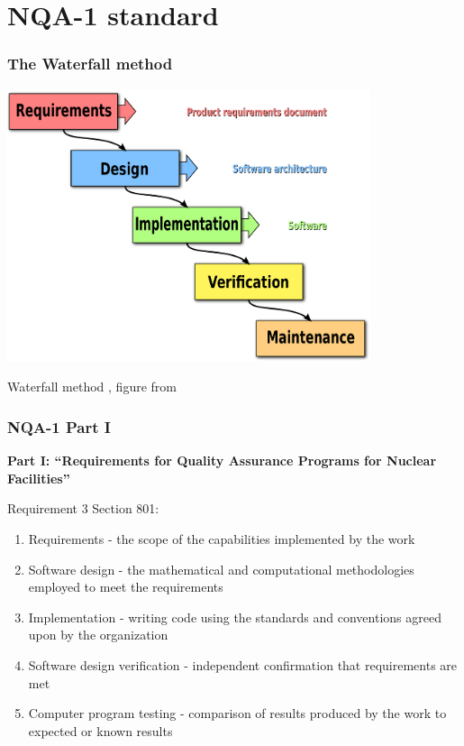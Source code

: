 \documentclass[12pt]{beamer}
\begin{document}
\section{NQA-1 standard}

\begin{frame}[fragile]
\frametitle{The Waterfall method}
\centerline{\includegraphics[width=0.8\textwidth]{figures/waterfall.pdf}}
Waterfall method \cite{waterfall}, figure from \cite{waterfall_wiki}
\end{frame}

\begin{frame}
\frametitle{NQA-1 Part I}

{\bf Part I: ``Requirements for Quality Assurance Programs for Nuclear Facilities''}

Requirement 3 Section 801:
\begin{enumerate}
\item{\alert{Requirements} - the scope of the capabilities implemented by the work}
\item{\alert{Software design} - the mathematical and computational methodologies employed to meet the requirements}
\item{\alert{Implementation} - writing code using the standards and conventions agreed upon by the organization}
\item{\alert{Software design verification} - independent confirmation that requirements are met}
\item{\alert{Computer program testing} - comparison of results produced by the work to expected or known results}
\end{enumerate}
\end{frame}
\end{document}
